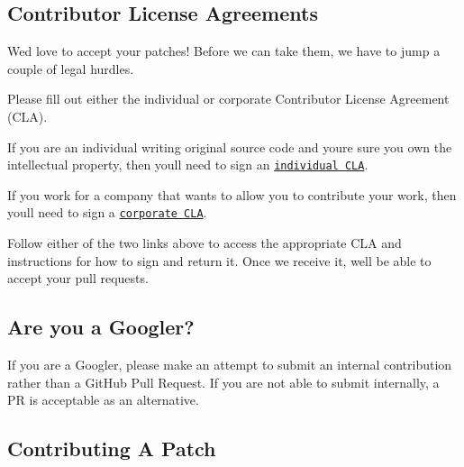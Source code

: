 \subsection*{Contributor License Agreements}

We\textquotesingle{}d love to accept your patches! Before we can take them, we have to jump a couple of legal hurdles.

Please fill out either the individual or corporate Contributor License Agreement (C\+LA).


\begin{DoxyItemize}
\item If you are an individual writing original source code and you\textquotesingle{}re sure you own the intellectual property, then you\textquotesingle{}ll need to sign an \href{https://developers.google.com/open-source/cla/individual}{\tt individual C\+LA}.
\item If you work for a company that wants to allow you to contribute your work, then you\textquotesingle{}ll need to sign a \href{https://developers.google.com/open-source/cla/corporate}{\tt corporate C\+LA}.
\end{DoxyItemize}

Follow either of the two links above to access the appropriate C\+LA and instructions for how to sign and return it. Once we receive it, we\textquotesingle{}ll be able to accept your pull requests.

\subsection*{Are you a Googler?}

If you are a Googler, please make an attempt to submit an internal contribution rather than a Git\+Hub Pull Request. If you are not able to submit internally, a PR is acceptable as an alternative.

\subsection*{Contributing A Patch}


